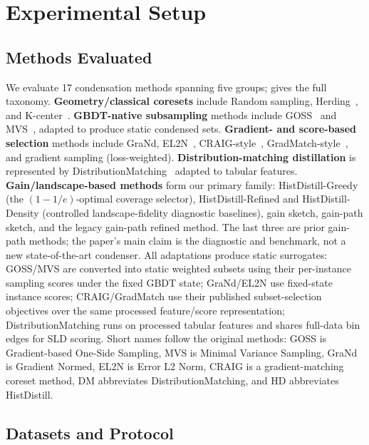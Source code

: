 
\section{Experimental Setup}
\label{sec:setup}

\subsection{Methods Evaluated}

We evaluate 17 condensation methods spanning five groups; 
gives the full taxonomy. \textbf{Geometry/classical coresets} include Random
sampling, Herding~\cite{welling2009herding}, and K-center~\cite{sener2018kcenter}.
\textbf{GBDT-native subsampling} methods include GOSS~\cite{ke2017lightgbm}
and MVS~\cite{ibragimov2019mvs}, adapted to produce static condensed sets.
\textbf{Gradient- and score-based selection} methods include GraNd,
EL2N~\cite{paul2021el2n}, CRAIG-style~\cite{mirzasoleiman2020craig},
GradMatch-style~\cite{killamsetty2021gradmatch}, and gradient sampling
(loss-weighted). \textbf{Distribution-matching distillation} is represented
by DistributionMatching~\cite{zhao2023dm} adapted to tabular features.
\textbf{Gain/landscape-based methods} form our primary family: HistDistill-Greedy
(the $(1-1/e)$-optimal coverage selector), HistDistill-Refined and
HistDistill-Density (controlled landscape-fidelity diagnostic baselines), gain
sketch, gain-path sketch, and the legacy gain-path refined method. The last
three are prior gain-path methods; the paper's main claim is the diagnostic and
benchmark, not a new state-of-the-art condenser. All adaptations produce static
surrogates: GOSS/MVS are converted into static weighted subsets using their
per-instance sampling scores under the fixed GBDT state; GraNd/EL2N use
fixed-state instance scores; CRAIG/GradMatch use their published
subset-selection objectives over the same processed feature/score representation;
DistributionMatching runs on processed tabular features and shares full-data
bin edges for SLD scoring.
Short names follow the original methods: GOSS is Gradient-based One-Side
Sampling, MVS is Minimal Variance Sampling, GraNd is Gradient Normed, EL2N is
Error L2 Norm, CRAIG is a gradient-matching coreset method, DM abbreviates
DistributionMatching, and HD abbreviates HistDistill.

\subsection{Datasets and Protocol}

